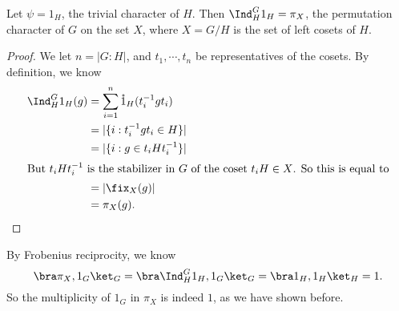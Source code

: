 \documentclass[a4paper]{article}
\begin{document}
\begin{lemma}
  Let $\psi = 1_H$, the trivial character of $H$. Then $\Ind_H^G 1_H = \pi_X$, the permutation character of $G$ on the set $X$, where $X = G/H$ is the set of left cosets of $H$.
\end{lemma}

\begin{proof}
  We let $n = |G:H|$, and $t_1, \cdots, t_n$ be representatives of the cosets. By definition, we know
  \begin{align*}
    \Ind_H^G 1_H(g) &= \sum_{i = 1}^n \mathring{1}_H(t_i^{-1} g t_i)\\
    &= |\{i: t_i^{-1}g t_i \in H\}|\\
    &= |\{i: g \in t_i H t_i^{-1}\}|\\
    \intertext{But $t_i H t_i^{-1}$ is the stabilizer in $G$ of the coset $t_i H \in X$. So this is equal to}
    &= |\fix_X(g)|\\
    &= \pi_X(g).
  \end{align*}
\end{proof}
By Frobenius reciprocity, we know
\[
  \bra \pi_X, 1_G\ket_G = \bra \Ind_H^G 1_H, 1_G\ket_G = \bra 1_H, 1_H\ket_H = 1.
\]
So the multiplicity of $1_G$ in $\pi_X$ is indeed $1$, as we have shown before.
\end{document}
